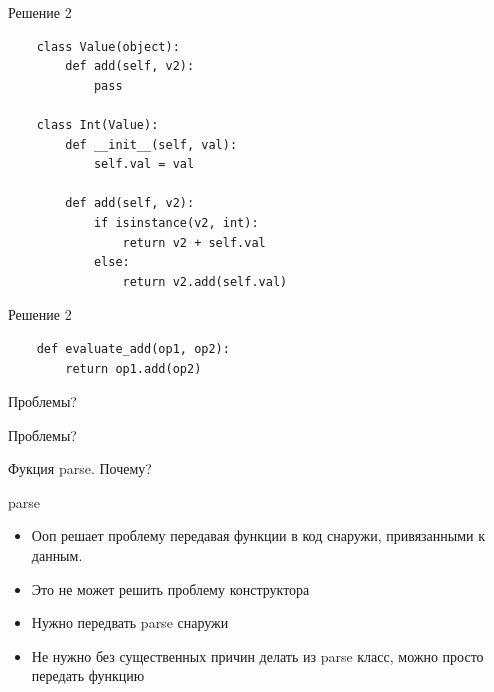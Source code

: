 \documentclass{article}
\begin{document}
\begin{center} Решение 2 \end{center}
\begin{lstlisting}
    class Value(object):
        def add(self, v2):
            pass

    class Int(Value):
        def __init__(self, val):
            self.val = val

        def add(self, v2):
            if isinstance(v2, int):
                return v2 + self.val
            else:
                return v2.add(self.val)
\end{lstlisting}
\newpage

\begin{center} Решение 2 \end{center}
\begin{lstlisting}
    def evaluate_add(op1, op2):
        return op1.add(op2)
\end{lstlisting}
\newpage

\begin{center} Проблемы? \end{center}
\newpage

\begin{center} Проблемы? \end{center}
Фукция parse. Почему?
\newpage

\begin{center} parse \end{center}
\begin{itemize}
    \item Ооп решает проблему передавая функции в код снаружи, привязанными к данным.
    \item Это не может решить проблему конструктора
    \item Нужно передвать parse снаружи
    \item Не нужно без существенных причин делать из parse класс, можно просто передать функцию
\end{itemize}
\newpage
\end{document}
